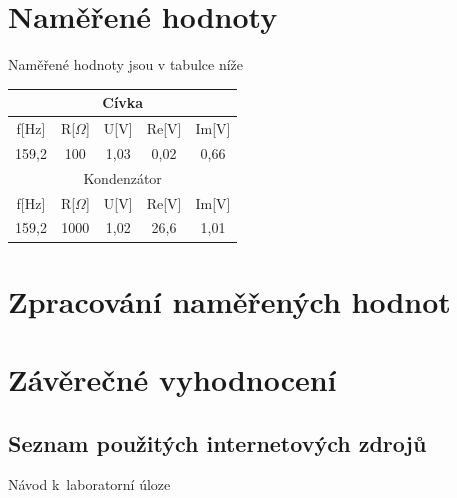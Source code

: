 \documentclass[a4paper,12pt]{article}   %
\newcommand{\tohm}{$\Omega$}
\begin{document}
\section{Naměřené hodnoty}
\label{chap:namerene_hodnoty}
Naměřené hodnoty jsou v tabulce níže

\begin{table}[h!]
  \centering
  \begin{tabular}{|c|c|c|c|c|}
  \hline
  \multicolumn{5}{|c|}{Cívka}       \\ \hline
  f[Hz]     & R[\tohm]    & U[V]    & Re[V]   & Im[V]   \\ \hline
  159,2 & 100  & 1,03    & 0,02 & 0,66 \\ \hline\hline
  \multicolumn{5}{|c|}{Kondenzátor} \\ \hline
  f[Hz]     & R[\tohm]    & U[V]    & Re[V]   & Im[V]   \\ \hline
  159,2 & 1000 & 1,02 & 26,6 & 1,01 \\ \hline
  \end{tabular}
  \end{table}



\section{Zpracování naměřených hodnot}
\label{chap:zpracovani_hodnot}




\section{Závěrečné vyhodnocení}
\label{chap:zaver}



\clearpage
\renewcommand{\refname}{Seznam použité literatury a~zdrojů informací} 

\begin{thebibliography}{99}

\subsection*{Seznam použitých internetových zdrojů}
     Návod k~laboratorní úloze
    
\end{thebibliography}
\end{document}
